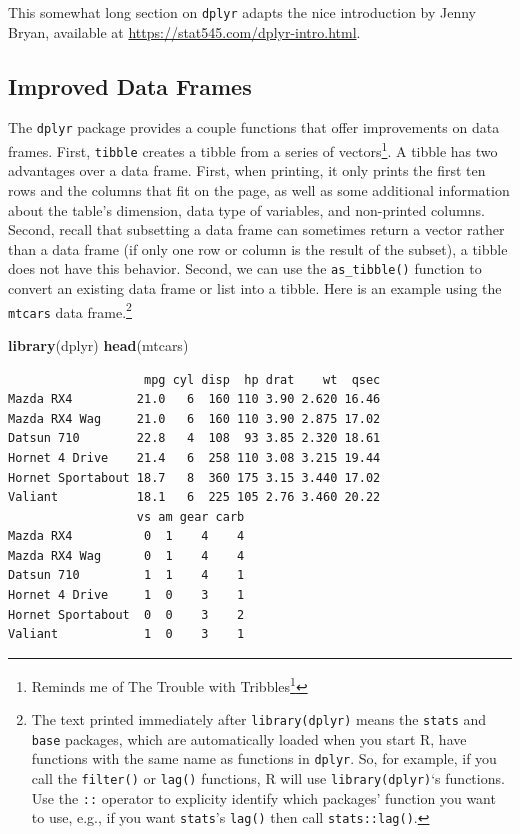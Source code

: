\documentclass[
]{krantz}
\makeatletter
\newenvironment{Shaded}{\begin{snugshade}}{\end{snugshade}}
\newcommand{\KeywordTok}[1]{\textcolor[rgb]{0.27,0.27,0.27}{\textbf{#1}}}
\newcommand{\NormalTok}[1]{#1}
\renewcommand{\href}[2]{#2\footnote{\url{#1}}}
\newenvironment{kframe}{%
\medskip{}
\setlength{\fboxsep}{.8em}
 \def\at@end@of@kframe{}%
 \ifinner\ifhmode%
  \def\at@end@of@kframe{\end{minipage}}%
  \begin{minipage}{\columnwidth}%
 \fi\fi%
 \def\FrameCommand##1{\hskip\@totalleftmargin \hskip-\fboxsep
 \colorbox{shadecolor}{##1}\hskip-\fboxsep
     \hskip-\linewidth \hskip-\@totalleftmargin \hskip\columnwidth}%
 \MakeFramed {\advance\hsize-\width
   \@totalleftmargin\z@ \linewidth\hsize
   \@setminipage}}%
 {\par\unskip\endMakeFramed%
 \at@end@of@kframe}
\renewenvironment{Shaded}{\begin{kframe}}{\end{kframe}}
\makeatother
\begin{document}
This somewhat long section on \texttt{dplyr} adapts the nice introduction by Jenny Bryan, available at \url{https://stat545.com/dplyr-intro.html}.

\hypertarget{improved-data-frames}{%
\subsection{Improved Data Frames}\label{improved-data-frames}}

The \texttt{dplyr} package provides a couple functions that offer improvements on data frames. First, \texttt{tibble} creates a tibble from a series of vectors\footnote{Reminds me of \href{https://en.wikipedia.org/wiki/The_Trouble_with_Tribbles}{The Trouble with Tribbles}}. A tibble has two advantages over a data frame. First, when printing, it only prints the first ten rows and the columns that fit on the page, as well as some additional information about the table's dimension, data type of variables, and non-printed columns. Second, recall that subsetting a data frame can sometimes return a vector rather than a data frame (if only one row or column is the result of the subset), a tibble does not have this behavior. Second, we can use the \texttt{as\_tibble()} function to convert an existing data frame or list into a tibble. Here is an example using the \texttt{mtcars} data frame.\footnote{The text printed immediately after \texttt{library(dplyr)} means the \texttt{stats} and \texttt{base} packages, which are automatically loaded when you start R, have functions with the same name as functions in \texttt{dplyr}. So, for example, if you call the \texttt{filter()} or \texttt{lag()} functions, R will use \texttt{library(dplyr)}`s functions. Use the \texttt{::} operator to explicity identify which packages' function you want to use, e.g., if you want \texttt{stats}'s \texttt{lag()} then call \texttt{stats::lag()}.}

\begin{Shaded}
\begin{Highlighting}[]
\KeywordTok{library}\NormalTok{(dplyr)}
\KeywordTok{head}\NormalTok{(mtcars)}
\end{Highlighting}
\end{Shaded}

\begin{verbatim}
                   mpg cyl disp  hp drat    wt  qsec
Mazda RX4         21.0   6  160 110 3.90 2.620 16.46
Mazda RX4 Wag     21.0   6  160 110 3.90 2.875 17.02
Datsun 710        22.8   4  108  93 3.85 2.320 18.61
Hornet 4 Drive    21.4   6  258 110 3.08 3.215 19.44
Hornet Sportabout 18.7   8  360 175 3.15 3.440 17.02
Valiant           18.1   6  225 105 2.76 3.460 20.22
                  vs am gear carb
Mazda RX4          0  1    4    4
Mazda RX4 Wag      0  1    4    4
Datsun 710         1  1    4    1
Hornet 4 Drive     1  0    3    1
Hornet Sportabout  0  0    3    2
Valiant            1  0    3    1
\end{verbatim}
\end{document}
